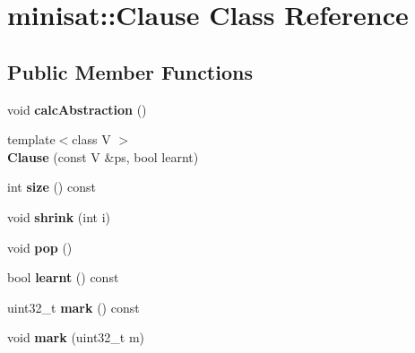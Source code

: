 \hypertarget{classminisat_1_1Clause}{\section{minisat\-:\-:\-Clause \-Class \-Reference}
\label{classminisat_1_1Clause}
}
\subsection*{\-Public \-Member \-Functions}
\begin{DoxyCompactItemize}
\item 
\hypertarget{classminisat_1_1Clause_ac3a9649256caf12f9a30c0ab35f35ce2}{void {\bfseries calc\-Abstraction} ()}\label{classminisat_1_1Clause_ac3a9649256caf12f9a30c0ab35f35ce2}

\item 
\hypertarget{classminisat_1_1Clause_af250c4e9e6ff7cf00f584e498517f1b1}{{\footnotesize template$<$class V $>$ }\\{\bfseries \-Clause} (const \-V \&ps, bool learnt)}\label{classminisat_1_1Clause_af250c4e9e6ff7cf00f584e498517f1b1}

\item 
\hypertarget{classminisat_1_1Clause_a27633b3f0195f133bf55dbd584dcb8a5}{int {\bfseries size} () const }\label{classminisat_1_1Clause_a27633b3f0195f133bf55dbd584dcb8a5}

\item 
\hypertarget{classminisat_1_1Clause_adedd9082f324b8da8e2184f072efd7bb}{void {\bfseries shrink} (int i)}\label{classminisat_1_1Clause_adedd9082f324b8da8e2184f072efd7bb}

\item 
\hypertarget{classminisat_1_1Clause_a414aac489e812813c56b80a8df075b68}{void {\bfseries pop} ()}\label{classminisat_1_1Clause_a414aac489e812813c56b80a8df075b68}

\item 
\hypertarget{classminisat_1_1Clause_a2f2935ff4862f69f2de9cc7707e5c3df}{bool {\bfseries learnt} () const }\label{classminisat_1_1Clause_a2f2935ff4862f69f2de9cc7707e5c3df}

\item 
\hypertarget{classminisat_1_1Clause_ae7a34f8c9f01e2e96529e9ab5df9fb44}{uint32\-\_\-t {\bfseries mark} () const }\label{classminisat_1_1Clause_ae7a34f8c9f01e2e96529e9ab5df9fb44}

\item 
\hypertarget{classminisat_1_1Clause_adcdb39ea3fe9f72b57f1916bd25ca210}{void {\bfseries mark} (uint32\-\_\-t m)}\label{classminisat_1_1Clause_adcdb39ea3fe9f72b57f1916bd25ca210}


\end{DoxyCompactItemize}
